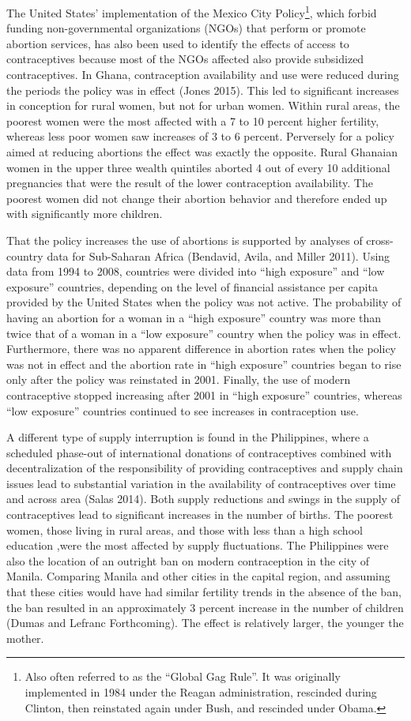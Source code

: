 \documentclass[]{article}
\begin{document}
The United States' implementation of the Mexico City Policy\footnote{Also often referred to as the ``Global Gag Rule''. It was originally implemented in 1984 under the Reagan administration, rescinded during Clinton, then reinstated again under Bush, and rescinded under Obama.}, which forbid funding non-governmental organizations (NGOs) that perform or promote abortion services, has also been used to identify the effects of access to contraceptives because most of the NGOs affected also provide subsidized contraceptives. In Ghana, contraception availability and use were reduced during the periods the policy was in effect (Jones 2015). This led to significant increases in conception for rural women, but not for urban women. Within rural areas, the poorest women were the most affected with a 7 to 10 percent higher fertility, whereas less poor women saw increases of 3 to 6 percent. Perversely for a policy aimed at reducing abortions the effect was exactly the opposite. Rural Ghanaian women in the upper three wealth quintiles aborted 4 out of every 10 additional pregnancies that were the result of the lower contraception availability. The poorest women did not change their abortion behavior and therefore ended up with significantly more children.

That the policy increases the use of abortions is supported by analyses of cross-country data for Sub-Saharan Africa (Bendavid, Avila, and Miller 2011). Using data from 1994 to 2008, countries were divided into ``high exposure'' and ``low exposure'' countries, depending on the level of financial assistance per capita provided by the United States when the policy was not active. The probability of having an abortion for a woman in a ``high exposure'' country was more than twice that of a woman in a ``low exposure'' country when the policy was in effect. Furthermore, there was no apparent difference in abortion rates when the policy was not in effect and the abortion rate in ``high exposure'' countries began to rise only after the policy was reinstated in 2001. Finally, the use of modern contraceptive stopped increasing after 2001 in ``high exposure'' countries, whereas ``low exposure'' countries continued to see increases in contraception use.

A different type of supply interruption is found in the Philippines, where a scheduled phase-out of international donations of contraceptives combined with decentralization of the responsibility of providing contraceptives and supply chain issues lead to substantial variation in the availability of contraceptives over time and across area (Salas 2014). Both supply reductions and swings in the supply of contraceptives lead to significant increases in the number of births. The poorest women, those living in rural areas, and those with less than a high school education ,were the most affected by supply fluctuations. The Philippines were also the location of an outright ban on modern contraception in the city of Manila. Comparing Manila and other cities in the capital region, and assuming that these cities would have had similar fertility trends in the absence of the ban, the ban resulted in an approximately 3 percent increase in the number of children (Dumas and Lefranc Forthcoming). The effect is relatively larger, the younger the mother.
\end{document}
